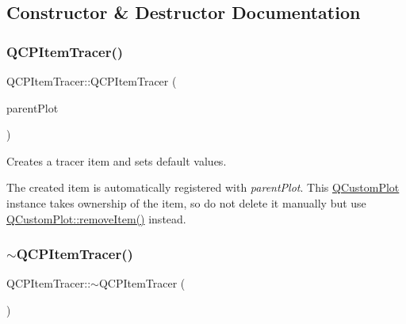 \subsection{Constructor \& Destructor Documentation}
\mbox{\label{class_q_c_p_item_tracer_adc5ca846eeac323db4aa1fc4081e36be}} 
\subsubsection{\texorpdfstring{Q\+C\+P\+Item\+Tracer()}{QCPItemTracer()}}
{\footnotesize\ttfamily Q\+C\+P\+Item\+Tracer\+::\+Q\+C\+P\+Item\+Tracer (\begin{DoxyParamCaption}\item[{\hyperlink{class_q_custom_plot}{Q\+Custom\+Plot} $\ast$}]{parent\+Plot }\end{DoxyParamCaption})\hspace{0.3cm}{\ttfamily [explicit]}}

Creates a tracer item and sets default values.

The created item is automatically registered with {\itshape parent\+Plot}. This \hyperlink{class_q_custom_plot}{Q\+Custom\+Plot} instance takes ownership of the item, so do not delete it manually but use \hyperlink{class_q_custom_plot_ae04446557292551e8fb6e2c106e1848d}{Q\+Custom\+Plot\+::remove\+Item()} instead. \mbox{\label{class_q_c_p_item_tracer_a43686565a9b70815915618636b9bdf0f}} 
\subsubsection{\texorpdfstring{$\sim$\+Q\+C\+P\+Item\+Tracer()}{~QCPItemTracer()}}
{\footnotesize\ttfamily Q\+C\+P\+Item\+Tracer\+::$\sim$\+Q\+C\+P\+Item\+Tracer (\begin{DoxyParamCaption}{ }\end{DoxyParamCaption})\hspace{0.3cm}{\ttfamily [virtual]}}




